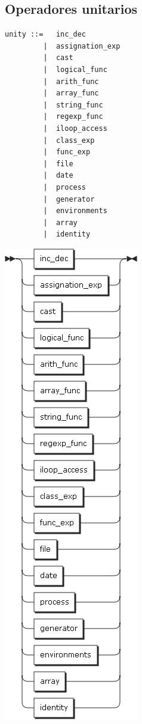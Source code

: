 \subsection{Operadores unitarios}
\begin{multicols}{2}
\begin{lstlisting}[style=nonumbers]      
unity ::=   inc_dec
         |  assignation_exp
         |  cast
         |  logical_func
         |  arith_func
         |  array_func
         |  string_func
         |  regexp_func
         |  iloop_access
         |  class_exp
         |  func_exp
         |  file
         |  date
         |  process
         |  generator
         |  environments
         |  array
         |  identity
\end{lstlisting}  
\columnbreak	
\begin{center}
\includegraphics[scale=0.5]{diagram/unity.png} \\
\end{center}
\end{multicols}

